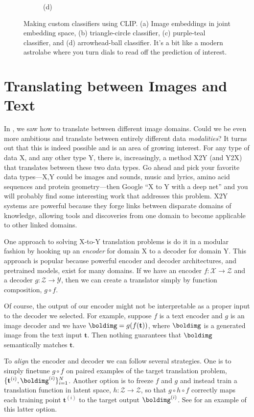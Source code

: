 \begin{figure}[h]
{\begin{subfigure}{0.25\textwidth}
    \caption*{(d)}
  \end{subfigure}%
  }
    \caption{Making custom classifiers using CLIP. (a) Image embeddings in joint embedding space, (b) triangle-circle classifier, (c) purple-teal classifier, and (d) arrowhead-ball classifier. It's a bit like a modern astrolabe where you turn dials to read off the prediction of interest.}
    \label{fig:vision_and_language:clip_clocks}
\end{figure}

\section{Translating between Images and Text}

In \chap{\ref{chapter:conditional_generative_models}}, we saw how to translate between different image domains. Could we be even more ambitious and translate between entirely different data \textit{modalities}? It turns out that this is indeed possible and is an area of growing interest. For any type of data X, and any other type Y, there is, increasingly, a method X2Y (and Y2X) that translates between these two data types. Go ahead and pick your favorite data types—X,Y could be images and sounds, music and lyrics, amino acid sequences and protein geometry—then Google ``X to Y with a deep net'' and you will probably find some interesting work that addresses this problem. X2Y systems are powerful because they forge links between disparate domains of knowledge, allowing tools and discoveries from one domain to become applicable to other linked domains.

One approach to solving X-to-Y translation problems is do it in a modular fashion by hooking up an \textit{encoder} for domain X to a decoder for domain Y. This approach is popular because powerful encoder and decoder architectures, and pretrained models, exist for many domains. If we have an encoder $f: \mathcal{X} \rightarrow \mathcal{Z}$ and a decoder $g: \mathcal{Z} \rightarrow \mathcal{Y}$, then we can create a translator simply by function composition, $g \circ f$.

Of course, the output of our encoder might not be interpretable as a proper input to the decoder we selected. For example, suppose $f$ is a text encoder and $g$ is an image decoder and we have $\boldimg = g(f(\mathbf{t}))$, where $\boldimg$ is a generated image from the text input $\mathbf{t}$. Then nothing guarantees that $\boldimg$ semantically matches $\mathbf{t}$.

To \textit{align} the encoder and decoder we can follow several strategies. One is to simply finetune $g \circ f$ on paired examples of the target translation problem, $\{\mathbf{t}^{(i)}, \boldimg^{(i)}\}_{i=1}^N$. Another option is to freeze $f$ and $g$ and instead train a translation function in latent space, $h: \mathcal{Z} \rightarrow \mathcal{Z}$, so that $g \circ h \circ f$ correctly maps each training point $\mathbf{t}^{(i)}$ to the target output $\boldimg^{(i)}$. See \cite{rombach2022high} for an example of this latter option.

